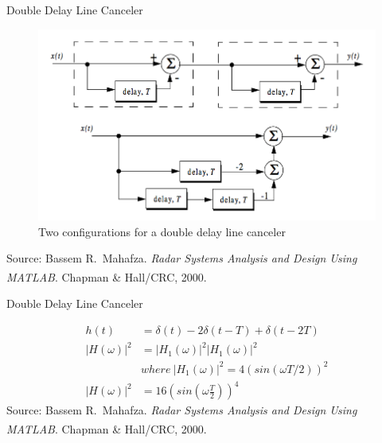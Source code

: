 \documentclass[mathserif]{beamer}
\begin{document}
    
    \begin{frame}{Double Delay Line Canceler}
      \begin{minipage}[t][0.8\textheight][t]{\textwidth}
	\begin{figure}[h]
		\centering
		\includegraphics[width=0.8\linewidth]{doubleDLC} 
		\caption{Two configurations for a double delay line canceler}
	\end{figure}
	\vfill
    	\tiny{Source: Bassem R.~Mahafza. \emph{Radar Systems Analysis and Design Using MATLAB\textsuperscript{\textregistered}}. Chapman \& Hall/CRC, 2000.}
      \end{minipage}
    \end{frame}
    
    
    \begin{frame}{Double Delay Line Canceler}
      \begin{minipage}[t][0.8\textheight][t]{\textwidth}
	\begin{align}
	  h(t) & = \delta(t) - 2\delta(t-T) + \delta(t-2T) \nonumber \\
	  |H(\omega)|^2 & = |H_1(\omega)|^2|H_1(\omega)|^2 \nonumber \\
	  & where~ |H_1(\omega)|^2 = 4(sin(\omega T/2))^2 \nonumber \\
	  |H(\omega)|^2 & = 16\left(sin\left(\omega\frac{T}{2}\right)\right)^4 \nonumber
	\end{align}
	\vfill
    	\tiny{Source: Bassem R.~Mahafza. \emph{Radar Systems Analysis and Design Using MATLAB\textsuperscript{\textregistered}}. Chapman \& Hall/CRC, 2000.}
      \end{minipage}
    \end{frame}
\end{document}
